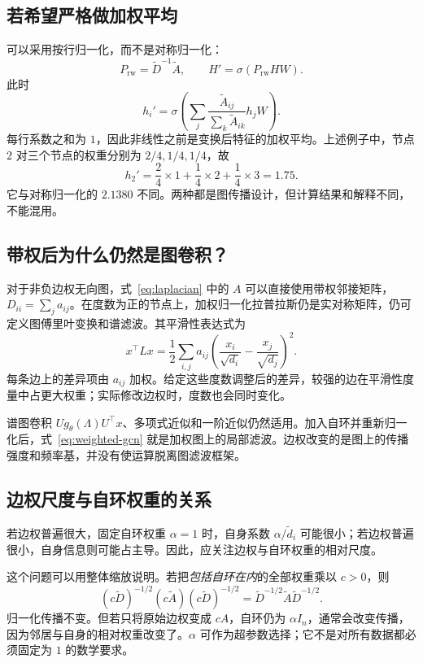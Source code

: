 \documentclass[UTF8,a4paper,11pt,fontset=fandol]{ctexart}
\begin{document}
\subsection{若希望严格做加权平均}
可以采用按行归一化，而不是对称归一化：
\begin{equation}
P_{\mathrm{rw}}=\widetilde D^{-1}\widetilde A,
\qquad H'=\sigma(P_{\mathrm{rw}}HW).
\end{equation}
此时
\begin{equation}
h_i'=\sigma\!\left(\sum_j
\frac{\widetilde A_{ij}}{\sum_k\widetilde A_{ik}}h_jW\right).
\end{equation}
每行系数之和为 $1$，因此非线性之前是变换后特征的加权平均。上述例子中，节点 $2$ 对三个节点的权重分别为 $2/4,1/4,1/4$，故
\begin{equation}
h_2'=\frac24\times1+\frac14\times2+\frac14\times3=1.75.
\end{equation}
它与对称归一化的 $2.1380$ 不同。两种都是图传播设计，但计算结果和解释不同，不能混用。

\subsection{带权后为什么仍然是图卷积？}
对于非负边权无向图，式~\eqref{eq:laplacian} 中的 $A$ 可以直接使用带权邻接矩阵，$D_{ii}=\sum_j a_{ij}$。在度数为正的节点上，加权归一化拉普拉斯仍是实对称矩阵，仍可定义图傅里叶变换和谱滤波。其平滑性表达式为
\begin{equation}
x^\top Lx=\frac12\sum_{i,j}a_{ij}
\left(\frac{x_i}{\sqrt{d_i}}-\frac{x_j}{\sqrt{d_j}}\right)^2.
\end{equation}
每条边上的差异项由 $a_{ij}$ 加权。给定这些度数调整后的差异，较强的边在平滑性度量中占更大权重；实际修改边权时，度数也会同时变化。

谱图卷积 $Ug_\theta(\Lambda)U^\top x$、多项式近似和一阶近似仍然适用。加入自环并重新归一化后，式~\eqref{eq:weighted-gcn} 就是加权图上的局部滤波。边权改变的是图上的传播强度和频率基，并没有使运算脱离图滤波框架。

\subsection{边权尺度与自环权重的关系}
若边权普遍很大，固定自环权重 $\alpha=1$ 时，自身系数 $\alpha/\widetilde d_i$ 可能很小；若边权普遍很小，自身信息则可能占主导。因此，应关注边权与自环权重的相对尺度。

这个问题可以用整体缩放说明。若把\emph{包括自环在内}的全部权重乘以 $c>0$，则
\begin{equation}
(c\widetilde D)^{-1/2}(c\widetilde A)(c\widetilde D)^{-1/2}
=\widetilde D^{-1/2}\widetilde A\widetilde D^{-1/2}.
\end{equation}
归一化传播不变。但若只将原始边权变成 $cA$，自环仍为 $\alpha I_n$，通常会改变传播，因为邻居与自身的相对权重改变了。$\alpha$ 可作为超参数选择；它不是对所有数据都必须固定为 $1$ 的数学要求。
\end{document}
